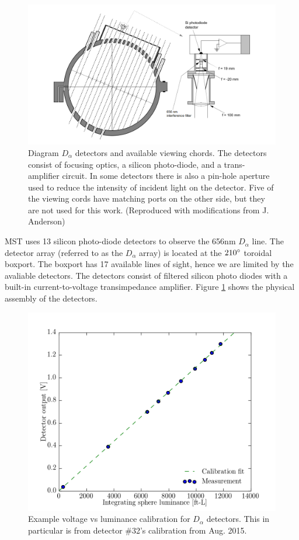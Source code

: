 \begin{figure}[!htb]
	\centering
	\includegraphics[width = 0.9\linewidth]{./implementation/d_alpha_detector.PNG}
	\caption[$D_{\alpha}$ detectors]{Diagram $D_{\alpha}$ detectors and available viewing chords. The detectors consist of focusing optics, a silicon photo-diode, and a trans-amplifier circuit. In some detectors there is also a pin-hole aperture used to reduce the intensity of incident light on the detector. Five of the viewing cords have matching ports on the other side, but they are not used for this work. (Reproduced with modifications from J. Anderson\cite{Anderson2001})}
	\label{fig:D_alpha_diagram}
\end{figure}

MST uses 13 silicon photo-diode detectors to observe the 656nm $D_\alpha$ line.  The detector array (referred to as the $D_{\alpha}$ array) is located at the $210 \degree$ toroidal boxport. The boxport has 17 available lines of sight, hence we are limited by the avaliable detectors. The detectors consist of filtered silicon photo diodes with a built-in current-to-voltage transimpedance amplifier. Figure \ref{fig:D_alpha_diagram} shows the physical assembly of the detectors.

\begin{figure}[!htb]
	\centering
	\includegraphics[width = 0.9\linewidth]{./implementation/diagnostics/l_vs_v.png}
	\caption[Example $D_{\alpha}$ calibration]{Example voltage vs luminance calibration for $D_{\alpha}$ detectors. This in particular is from detector \#32's calibration from Aug. 2015.}
	\label{fig:l_vs_v}
\end{figure}

